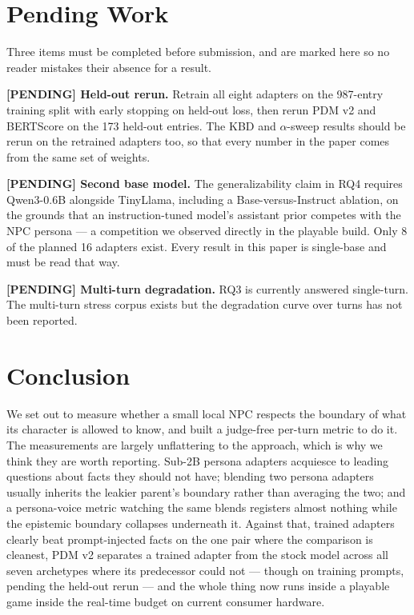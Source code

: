 \documentclass[conference]{IEEEtran}
\begin{document}
\section{Pending Work} \label{sec:pending}

Three items must be completed before submission, and are marked here so no
reader mistakes their absence for a result.

\textbf{[PENDING] Held-out rerun.} Retrain all eight adapters on the 987-entry
training split with early stopping on held-out loss, then rerun PDM v2 and
BERTScore on the 173 held-out entries. The KBD and $\alpha$-sweep results
should be rerun on the retrained adapters too, so that every number in the
paper comes from the same set of weights.

\textbf{[PENDING] Second base model.} The generalizability claim in RQ4 requires
Qwen3-0.6B alongside TinyLlama, including a Base-versus-Instruct ablation, on
the grounds that an instruction-tuned model's assistant prior competes with the
NPC persona --- a competition we observed directly in the playable build. Only
8 of the planned 16 adapters exist. Every result in this paper is single-base
and must be read that way.

\textbf{[PENDING] Multi-turn degradation.} RQ3 is currently answered
single-turn. The multi-turn stress corpus exists but the degradation curve over
turns has not been reported.

\section{Conclusion}

We set out to measure whether a small local NPC respects the boundary of what
its character is allowed to know, and built a judge-free per-turn metric to do
it. The measurements are largely unflattering to the approach, which is why we
think they are worth reporting. Sub-2B persona adapters acquiesce to leading
questions about facts they should not have; blending two persona adapters
usually inherits the leakier parent's boundary rather than averaging the two;
and a persona-voice metric watching the same blends registers almost nothing
while the epistemic boundary collapses underneath it. Against that, trained
adapters clearly beat prompt-injected facts on the one pair where the comparison
is cleanest, PDM v2 separates a trained adapter from the stock model across
all seven archetypes where its predecessor could not --- though on training
prompts, pending the held-out rerun --- and the whole thing now runs inside a
playable game inside the real-time budget on current consumer hardware.
\end{document}
